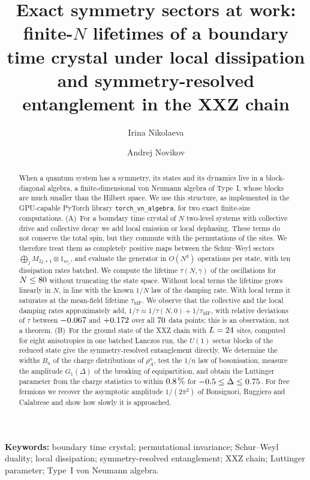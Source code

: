 \documentclass[11pt]{article}
\title{Exact symmetry sectors at work: finite-$N$ lifetimes of a boundary time crystal under local dissipation and
symmetry-resolved entanglement in the XXZ chain}
\author{Irina Nikolaeva \and Andrej Novikov}
\date{}
\newcommand{\taumf}{\tau_{\mathrm{MF}}}
\begin{document}
\maketitle

\begin{abstract}
When a quantum system has a symmetry, its states and its dynamics live in a block-diagonal algebra, a finite-dimensional
von Neumann algebra of Type~I, whose blocks are much smaller than the Hilbert space. We use this structure, as
implemented in the GPU-capable PyTorch library \texttt{torch\_vn\_algebra}, for two exact finite-size computations.
(A)~For a boundary time crystal of $N$ two-level systems with collective drive and collective decay we add local
emission or local dephasing. These terms do not conserve the total spin, but they commute with the permutations of the
sites. We therefore treat them as completely positive maps between the Schur--Weyl sectors
$\bigoplus_jM_{2j+1}\otimes1_{m_j}$, and evaluate the generator in $O(N^3)$ operations per state, with ten dissipation
rates batched. We compute the lifetime $\tau(N,\gamma)$ of the oscillations for $N\le80$ without truncating the
state space. Without local terms the lifetime grows linearly in $N$, in line with the known $1/N$ law of the damping
rate. With local terms it saturates at the mean-field lifetime $\taumf$. We observe that the collective and the local
damping rates approximately add, $1/\tau\approx1/\tau(N,0)+1/\taumf$, with relative deviations of $\tau$ between
$-0.067$ and $+0.172$ over all $70$ data points; this is an observation, not a theorem. (B)~For the ground state of the
XXZ chain with $L=24$ sites, computed for eight anisotropies in one batched Lanczos run, the $U(1)$ sector blocks of
the reduced state give the symmetry-resolved entanglement directly. We determine the widths $B_n$ of the charge
distributions of $\rho_A^n$, test the $1/n$ law of bosonisation, measure the amplitude $G_1(\Delta)$ of the breaking of
equipartition, and obtain the Luttinger parameter from the charge statistics to within $0.8\,\%$ for
$-0.5\le\Delta\le0.75$. For free fermions we recover the asymptotic amplitude $1/(2\pi^2)$ of
Bonsignori, Ruggiero and Calabrese and show how slowly it is approached.
\end{abstract}

\noindent\textbf{Keywords:} boundary time crystal; permutational invariance; Schur--Weyl duality; local dissipation;
symmetry-resolved entanglement; XXZ chain; Luttinger parameter; Type~I von Neumann algebra.
\end{document}
